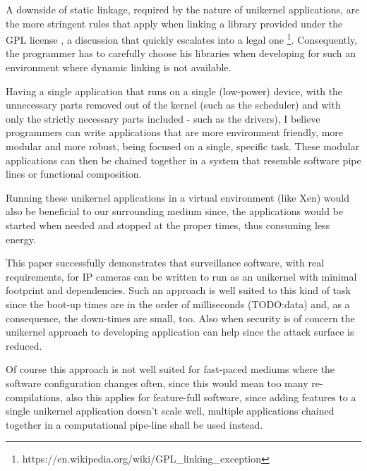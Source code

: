 \documentclass[10pt,a4paper,twoside]{article}
\begin{document}
A downside of static linkage, required by the nature of unikernel applications, are the more stringent rules that apply when linking a library provided under the GPL license \cite{gpl}, a discussion that quickly escalates into a legal one \footnote{https://en.wikipedia.org/wiki/GPL\_linking\_exception}. Consequently, the programmer has to carefully choose his libraries when developing for such an environment where dynamic linking is not available.

Having a single application that runs on a single (low-power) device, with the unnecessary parts removed out
of the kernel (such as the scheduler) and with only the strictly necessary parts included - such as the drivers),
I believe programmers can write applications that are more environment friendly,
more modular and more robust, being focused on a single, specific task. These modular applications can then be chained together in a system that resemble software pipe lines or functional composition.

Running these unikernel applications in a virtual environment (like Xen) would also be
beneficial to our surrounding medium since, the applications would be started when
needed and stopped at the proper times, thus consuming less energy. \cite{DataCenterEnergyForeCast} \cite{JinWenChen}

This paper successfully demonstrates that surveillance software, with real requirements,
 for IP cameras can be written to run as an unikernel with minimal footprint and dependencies. Such an approach is well suited to this kind of task since the boot-up times are in the order of milliseconds (TODO:data) and, as a consequence, the down-times are small, too. Also when security is of concern the unikernel approach to developing application can help since the attack surface is reduced.

 Of course this approach is not well suited for fast-paced mediums where the software configuration changes often,
 since this would mean too many re-compilations, also this applies for feature-full software, since adding features to a single unikernel application doesn't scale well, multiple applications chained together in a computational pipe-line shall be used instead.
\end{document}
